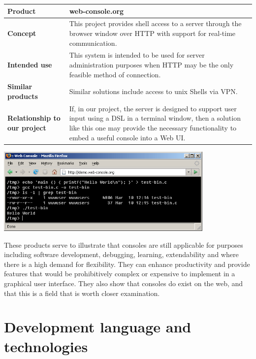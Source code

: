 \begin{center}
\begin{tabularx}{\textwidth}{ l X }
\hline
\textbf{Product} & web-console.org \\ \hline
\textbf{Concept} & This project provides shell access to a server through the browser window over HTTP with support for real-time communication. \\ \hline
\textbf{Intended use} & This system is intended to be used for server administration purposes when HTTP may be the only feasible method of connection. \\ \hline
\textbf{Similar products} & Similar solutions include access to unix Shells via VPN. \\ \hline
\textbf{Relationship to our project} & If, in our project, the server is designed to support user input using a DSL in a terminal window, then a solution like this one may provide the necessary functionality to embed a useful console into a Web UI. \\ \hline
\end{tabularx}
\label{tab:webconsolec}
\end{center}

\begin{center}
\includegraphics[width = 0.8\textwidth]{image/webconsole.png}
\label{webconsolecimage}%
\end{center}

These products serve to illustrate that consoles are still applicable for purposes including software development, debugging, learning, extendability and where there is a high demand for flexibility. They can enhance productivity and provide features that would be prohibitively complex or expensive to implement in a graphical user interface. They also show that consoles do exist on the web, and that this is a field that is worth closer examination.


\section{Development language and technologies}

